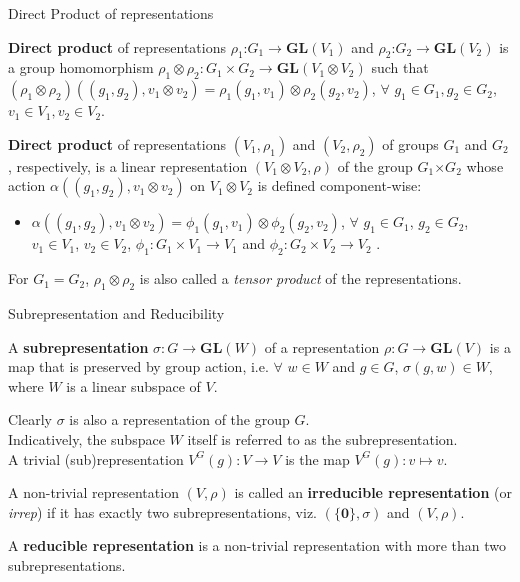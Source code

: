 \documentclass{beamer}
\newcommand\boldtext[1]{\textcolor{bolds}{\textbf{#1}}}
\newcommand\italictext[1]{\textcolor{italics}{\textit{#1}}}
\begin{document}
\begin{frame}{Direct Product of representations}
    \begin{definition}[1]
        \boldtext{Direct product} of representations $\rho_1$:$G_1\xrightarrow{}\mathbf{GL}(V_1)$ and $\rho_2$:$G_2\xrightarrow{}\mathbf{GL}(V_2)$ is a group homomorphism $\rho_1\otimes\rho_2:G_1\times G_2\xrightarrow{}\mathbf{GL}(V_1\otimes V_2)$ such that $(\rho_1\otimes\rho_2)((g_1,g_2),v_1\otimes v_2)=\rho_1(g_1,v_1)\otimes\rho_2(g_2,v_2)$, $\forall$ $g_1 \in G_1, g_2 \in G_2$, $v_1\in V_1, v_2\in V_2$.
    \end{definition}
    \begin{definition}[2]
        \boldtext{Direct product} of representations $(V_1,\rho_1)$ and $(V_2,\rho_2)$ of groups $G_1$ and $G_2$, respectively, is a linear representation $(V_1\otimes V_2,\rho)$ of the group $G_1$$\times$$G_2$ whose action $\alpha((g_1,g_2),v_1\otimes v_2)$ on $V_1\otimes V_2$ is defined component-wise:
        \begin{itemize}
            \item $\alpha((g_1,g_2),v_1\otimes v_2)=\phi_1(g_1,v_1)\otimes\phi_2(g_2,v_2)$, $\forall$ $g_1 \in G_1$, $g_2 \in G_2$, $v_1\in V_1$, $v_2\in V_2$, $\phi_1:G_1\times V_1\xrightarrow{}V_1$ and $\phi_2:G_2\times V_2\xrightarrow{}V_2$ .
        \end{itemize}
    \end{definition}
    For $G_1=G_2$, $\rho_1\otimes\rho_2$ is also called a \italictext{tensor product} of the representations.
\end{frame}

\begin{frame}{Subrepresentation and Reducibility}
    \begin{definition}
        A \boldtext{subrepresentation} $\sigma:G\xrightarrow{}\mathbf{GL}(W)$ of a representation $\rho:G\xrightarrow{}\mathbf{GL}(V)$ is a map that is preserved by group action, i.e. $\forall$ $w\in W$ and $g\in G$, $\sigma(g,w)\in W$, where $W$ is a linear subspace of $V$.
    \end{definition}
    Clearly $\sigma$ is also a representation of the group $G$.\\
    Indicatively, the subspace $W$ itself is referred to as the subrepresentation.\\
    A trivial (sub)representation $V^G(g):V\xrightarrow{}V$ is the map $V^G(g):v\mapsto v$.
    \begin{definition}
        A non-trivial representation $(V,\rho)$ is called an \boldtext{irreducible representation} (or \italictext{irrep}) if it has exactly two subrepresentations, viz. $(\{\mathbf{0}\},\sigma)$ and $(V,\rho)$.
    \end{definition}
    \begin{definition}
        A \boldtext{reducible representation} is a non-trivial representation with more than two subrepresentations.
    \end{definition}
\end{frame}
\end{document}
